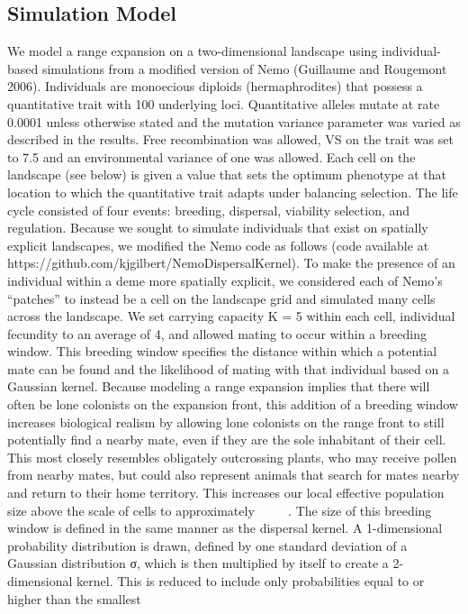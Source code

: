 \subsection{Simulation Model}
We model a range expansion on a two-dimensional landscape using individual-based simulations from a modified version of Nemo (Guillaume and Rougemont 2006). Individuals are monoecious diploids (hermaphrodites) that possess a quantitative trait with 100 underlying loci. Quantitative alleles mutate at rate 0.0001 unless otherwise stated and the mutation variance parameter was varied as described in the results. Free recombination was allowed, VS on the 
trait was set to 7.5 and an environmental variance of one was allowed. Each cell on the landscape (see below) is given a value that sets the optimum phenotype at that location to which the quantitative trait adapts under balancing selection. The life cycle consisted of four events: breeding, dispersal, viability selection, and regulation. 
Because we sought to simulate individuals that exist on spatially explicit landscapes, we modified 
the Nemo code as follows (code available at https://github.com/kjgilbert/NemoDispersalKernel). 
To make the presence of an individual within a deme more spatially explicit, we considered each 
of Nemo’s “patches” to instead be a cell on the landscape grid and simulated many cells across 
the landscape. We set carrying capacity K = 5 within each cell, individual fecundity to an 
average of 4, and allowed mating to occur within a breeding window. This breeding window 
specifies the distance within which a potential mate can be found and the likelihood of 
mating with that individual based on a Gaussian kernel. Because modeling a range expansion 
implies that there will often be lone colonists on the expansion front, this addition of a 
breeding window increases biological realism by allowing lone colonists on the range front 
to still potentially find a nearby mate, even if they are the sole inhabitant of their cell. 
This most closely resembles obligately outcrossing plants, who may receive pollen from nearby 
mates, but could also represent animals that search for mates nearby and return to their home 
territory. This increases our local effective population size above the scale of cells to 
approximately    ~~~~ . The size of this breeding window is defined in the same manner as the 
dispersal kernel. A 1-dimensional probability distribution is drawn, defined by one standard 
deviation of a Gaussian distribution σ, which is then multiplied by itself to create a 2-dimensional 
kernel. This is reduced to include only probabilities equal to or higher than the smallest 
